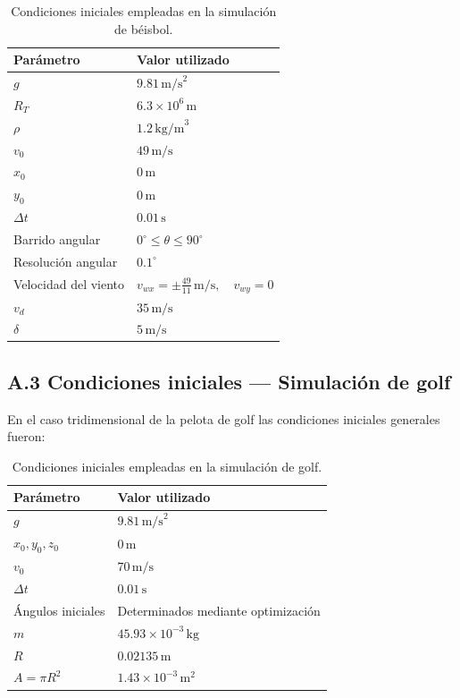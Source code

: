 \documentclass[11pt,a4paper]{article}
\begin{document}
\begin{table}[H]
\centering
\begin{tabular}{ll}
\toprule
Parámetro & Valor utilizado \\
\midrule
$g$ & $9.81\,\text{m/s}^2$ \\
$R_T$ & $6.3 \times 10^6\,\text{m}$ \\
$\rho$ & $1.2\,\text{kg/m}^3$ \\
$v_0$ & $49\,\text{m/s}$ \\
$x_0$ & $0\,\text{m}$ \\
$y_0$ & $0\,\text{m}$ \\
$\Delta t$ & $0.01\,\text{s}$ \\
Barrido angular & $0^\circ \leq \theta \leq 90^\circ$ \\
Resolución angular & $0.1^\circ$ \\
Velocidad del viento & $v_{wx} = \pm \frac{49}{11}\,\text{m/s}, \quad v_{wy}=0$ \\
$v_d$ & $35\,\text{m/s}$ \\
$\delta$ & $5\,\text{m/s}$ \\
\bottomrule
\end{tabular}
\caption{Condiciones iniciales empleadas en la simulación de béisbol.}
\end{table}

\subsection*{A.3 Condiciones iniciales — Simulación de golf}

En el caso tridimensional de la pelota de golf las condiciones iniciales generales fueron:

\begin{table}[H]
\centering
\begin{tabular}{ll}
\toprule
Parámetro & Valor utilizado \\
\midrule
$g$ & $9.81\,\text{m/s}^2$ \\
$x_0,y_0,z_0$ & $0\,\text{m}$ \\
$v_0$ & $70\,\text{m/s}$\\
$\Delta t$ & $0.01\,\text{s}$ \\
Ángulos iniciales & Determinados mediante optimización \\
$m$ & $45.93 \times 10^{-3}\,\text{kg}$ \\
$R$ & $0.02135\,\text{m}$ \\
$A=\pi R^2$ & $1.43 \times 10^{-3}\,\text{m}^2$ \\
\bottomrule
\end{tabular}
\caption{Condiciones iniciales empleadas en la simulación de golf.}
\end{table}
\end{document}
